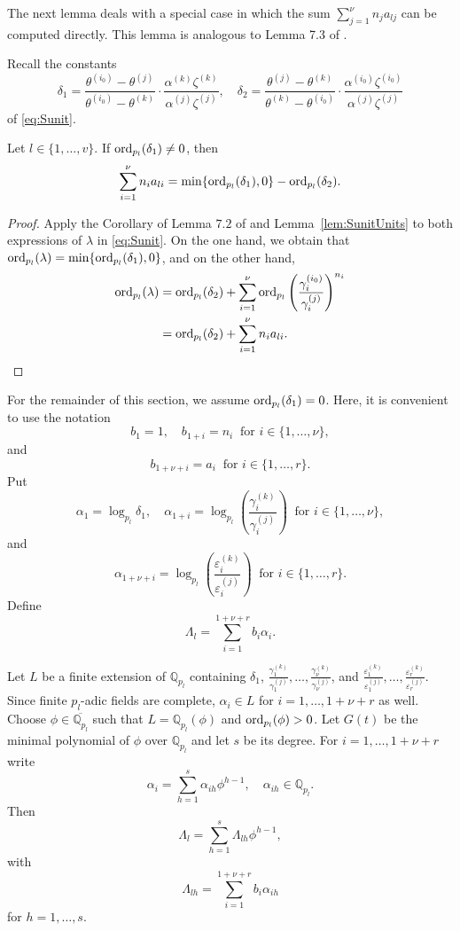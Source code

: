 The next lemma deals with a special case in which the sum $\sum_{j = 1}^{\nu} n_ja_{lj}$ can be computed directly. This lemma is analogous to Lemma 7.3 of \cite{TW3} . 

Recall the constants
\[\delta_1 = \frac{\theta^{(i_0)} - \theta^{(j)}}{\theta^{(i_0)} - \theta^{(k)}}\cdot\frac{\alpha^{(k)}\zeta^{(k)}}{\alpha^{(j)}\zeta^{(j)}}, \quad \delta_2 = \frac{\theta^{(j)} - \theta^{(k)}}{\theta^{(k)} - \theta^{(i_0)}}\cdot \frac{\alpha^{(i_0)}\zeta^{(i_0)}}{\alpha^{(j)}\zeta^{(j)}}\]
of \eqref{eq:Sunit}.
\begin{lemma}\label{lem:Delta1}
Let $l \in \{1, \dots, v\}$. If $\operatorname{ord}_{p_l}(\delta_1) \neq 0$, then 
\[ \sum_{i = 1}^{\nu} n_ia_{li} = \min\{\operatorname{ord}_{p_l}(\delta_1), 0\} - \operatorname{ord}_{p_l}(\delta_2).\]
\end{lemma}

\begin{proof}
Apply the Corollary of Lemma $7.2$ of \cite{TW3} and Lemma~\ref{lem:SunitUnits} to both expressions of $\lambda$ in \eqref{eq:Sunit}. On the one hand, we obtain that $\operatorname{ord}_{p_l}(\lambda) = \min\{\operatorname{ord}_{p_l}(\delta_1), 0\}$, and on the other hand, 
\begin{align*}
\operatorname{ord}_{p_l}(\lambda)
& = \operatorname{ord}_{p_l}(\delta_2) + \sum_{i = 1}^{\nu} \operatorname{ord}_{p_l}\left( \frac{\gamma_i^{(i_0)}}{\gamma_i^{(j)}}\right)^{n_i}\\
& = \operatorname{ord}_{p_l}(\delta_2) + \sum_{i = 1}^{\nu} n_ia_{li}.
\end{align*}
\end{proof}

For the remainder of this section, we assume $\operatorname{ord}_{p_l}(\delta_1) = 0$. Here, it is convenient to use the notation
\[b_1 = 1, \quad b_{1+i} = n_i \ \text{ for } i \in \{1, \dots, \nu\},\] 
and
\[ b_{1+{\nu}+i} = a_i \ \text{ for } i  \in \{1, \dots, r\}.\]
Put
\[\alpha_1 = \log_{p_l} \delta_1, \quad \alpha_{1+i} = \log_{p_l}\left( \frac{\gamma_i^{(k)}}{\gamma_i^{(j)}}\right)  \ \text{ for } i \in \{1, \dots, \nu\},\]
and
\[\alpha_{1+\nu+i} = \log_{p_l}\left( \frac{\varepsilon_i^{(k)}}{\varepsilon_i^{(j)}}\right) \ \text{ for } i  \in \{1, \dots, r\}.\]
Define
\[\Lambda_l = \sum_{i = 1}^{1+\nu+r} b_i\alpha_i.\]

Let $L$ be a finite extension of $\mathbb{Q}_{p_l}$ containing $\delta_1$, $\frac{\gamma_1^{(k)}}{\gamma_1^{(j)}}, \dots, \frac{\gamma_{\nu}^{(k)}}{\gamma_{\nu}^{(j)}}$, and $\frac{\varepsilon_1^{(k)}}{\varepsilon_1^{(j)}}, \dots, \frac{\varepsilon_r^{(k)}}{\varepsilon_r^{(j)}}$. Since finite $p_l$-adic fields are complete, $\alpha_i \in L$ for $i = 1, \dots, 1+\nu+r$ as well. Choose $\phi \in \overline{\mathbb{Q}_{p_l}}$ such that $L = \mathbb{Q}_{p_l}(\phi)$ and $\operatorname{ord}_{p_l}(\phi) > 0 $. Let $G(t)$ be the minimal polynomial of $\phi$ over $\mathbb{Q}_{p_l}$ and let $s$ be its degree. For $i = 1, \dots, 1+\nu+r$ write
\[\alpha_i = \sum_{h = 1}^s \alpha_{ih}\phi^{h - 1}, \quad \alpha_{ih} \in \mathbb{Q}_{p_l}.\]
Then
\begin{equation} \label{eq:LambdaL}
\Lambda_l = \sum_{h = 1}^s \Lambda_{lh}\phi^{h-1},
\end{equation}
with
\[\Lambda_{lh} = \sum_{i = 1}^{1+\nu+r} b_i \alpha_{ih}\]
for $h = 1, \dots, s$. 

